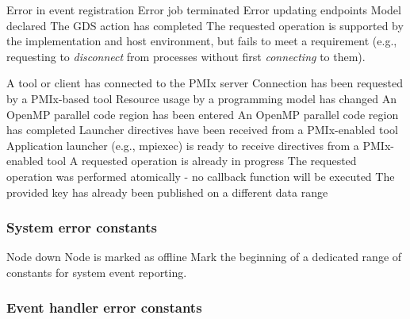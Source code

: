 \begin{constantdesc}
%
Error in event registration
%
Error job terminated
%
Error updating endpoints
%
Model declared
%
The \ac{GDS} action has completed
%
The requested operation is supported by the implementation and host environment, but fails to meet a requirement (e.g., requesting to \textit{disconnect} from processes without first \textit{connecting} to them).

A tool or client has connected to the \ac{PMIx} server
%
Connection has been requested by a PMIx-based tool
%
Resource usage by a programming model has changed
%
An OpenMP parallel code region has been entered
%
An OpenMP parallel code region has completed
%
Launcher directives have been received from a PMIx-enabled tool
%
Application launcher (e.g., mpiexec) is ready to receive directives from a PMIx-enabled tool
%
A requested operation is already in progress
%
The requested operation was performed atomically - no callback function will be executed
%
The provided key has already been published on a different data range

\end{constantdesc}

\subsubsection{System error constants}

\begin{constantdesc}
%
Node down
%
Node is marked as offline
%
Mark the beginning of a dedicated range of constants for system event reporting.
\end{constantdesc}
%

\subsubsection{Event handler error constants}

